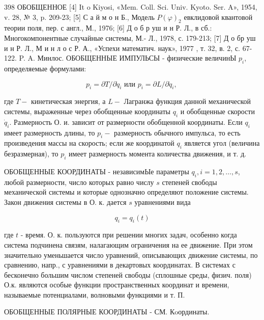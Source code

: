 \documentclass[10pt]{article}
\begin{document}
398 ОБОБЩЕННОЕ [4] It o Kiyosi, «Mem. Coll. Sci. Univ. Kyoto. Ser. A», 1954, v. 28, № 3, p. 209-23; [5] С а й м о н Б., Модель $P(\varphi)_{2}$ евклидовой квантовой теории поля, пер. с англ., М., 1976; [6] Д о б р уш и н Р. Л., в сб.: Многокомпонентные случайные системы, М.- Л., 1978, с. 179-213; [7] Д о бр уш и н Р. Л., М и н л о с Р. А., «Успехи математич. наук», 1977 , т. 32, в. 2, с. 67-122. P. A. Минлос. ОБОБЩЕННЫЕ ИМПУЛЬСЫ - физические величинЫ $p_{i}$, определяемые формулами:



\[

p_{i}=\partial T / \partial \dot{q}_{i} \text { или } p_{i}=\partial L / \partial \dot{q}_{i} \text {, }

\]



где $T-$ кинетическая энергия, а $L-$ Лагранжа функция данной механической системы, выраженные через обобщенные координаты $q_{i}$ и обобщенные скорости $\dot{q}_{i}$. Размерность О. и. зависит от размерности обобщенной координаты. Если $q_{i}$ имеет размерность длины, то $p_{i}-$ размерность обычного импульса, то есть произведения массы на скорость; если же координатой $q_{i}$ является угол (величина безразмерная), то $p_{i}$ имеет размерность момента количества движения, и т. д.



ОБОБЩЕННЫЕ КООРДИНАТЫ - независимЫе параметры $q_{i}, i=1,2, \ldots, s$, любой размерности, число которых равно числу $s$ степеней свободы механической системы и которые однозначно определяют положение системы. Закон движения системы в О. к. дается $s$ уравнениями вида



\[

q_{i}=q_{i}(t)

\]



где $t$ - время. О. к. пользуются при решении многих задач, особенно когда система подчинена связям, налагающим ограничения на ее движение. При этом значительно уменьшается число уравнений, описывающих движение системы, по сравнению, напр., с уравнениями в декартовых координатах. В системах с бесконечно большим числом степеней свободы (сплошные среды, физич. поля) О.к. являются особые функции пространственных координат и времени, называемые потенциалами, волновыми функциями и т. П.



ОБОБЩЕННЫЕ ПОЛЯРНЫЕ КООРДИНАТЫ - СМ. Кoординаты.
\end{document}
